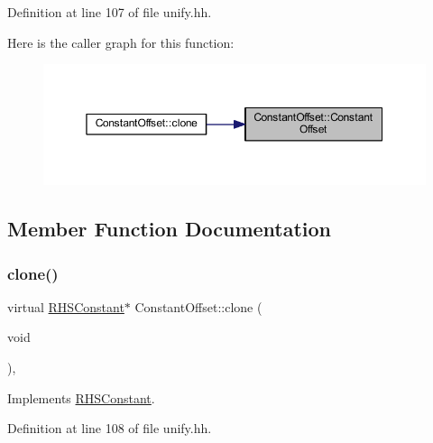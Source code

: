 Definition at line 107 of file unify.\+hh.

Here is the caller graph for this function\+:
\nopagebreak
\begin{figure}[H]
\begin{center}
\leavevmode
\includegraphics[width=350pt]{class_constant_offset_a2dc245509eb72dd4ee3ab7be5609e1e0_icgraph}
\end{center}
\end{figure}


\subsection{Member Function Documentation}
\mbox{\label{class_constant_offset_a0e13d942d1a2f59e329796ccae56c238}} 
\subsubsection{\texorpdfstring{clone()}{clone()}}
{\footnotesize\ttfamily virtual \mbox{\hyperlink{class_r_h_s_constant}{R\+H\+S\+Constant}}$\ast$ Constant\+Offset\+::clone (\begin{DoxyParamCaption}\item[{void}]{ }\end{DoxyParamCaption})\hspace{0.3cm}{\ttfamily [inline]}, {\ttfamily [virtual]}}



Implements \mbox{\hyperlink{class_r_h_s_constant_a3e43335a89351a453932a8c0544d5722}{R\+H\+S\+Constant}}.



Definition at line 108 of file unify.\+hh.

